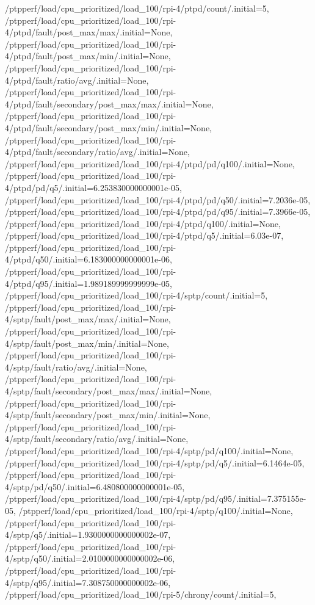 {    /ptpperf/load/cpu_prioritized/load_100/rpi-4/ptpd/count/.initial=5,
    /ptpperf/load/cpu_prioritized/load_100/rpi-4/ptpd/fault/post_max/max/.initial=None,
    /ptpperf/load/cpu_prioritized/load_100/rpi-4/ptpd/fault/post_max/min/.initial=None,
    /ptpperf/load/cpu_prioritized/load_100/rpi-4/ptpd/fault/ratio/avg/.initial=None,
    /ptpperf/load/cpu_prioritized/load_100/rpi-4/ptpd/fault/secondary/post_max/max/.initial=None,
    /ptpperf/load/cpu_prioritized/load_100/rpi-4/ptpd/fault/secondary/post_max/min/.initial=None,
    /ptpperf/load/cpu_prioritized/load_100/rpi-4/ptpd/fault/secondary/ratio/avg/.initial=None,
    /ptpperf/load/cpu_prioritized/load_100/rpi-4/ptpd/pd/q100/.initial=None,
    /ptpperf/load/cpu_prioritized/load_100/rpi-4/ptpd/pd/q5/.initial=6.253830000000001e-05,
    /ptpperf/load/cpu_prioritized/load_100/rpi-4/ptpd/pd/q50/.initial=7.2036e-05,
    /ptpperf/load/cpu_prioritized/load_100/rpi-4/ptpd/pd/q95/.initial=7.3966e-05,
    /ptpperf/load/cpu_prioritized/load_100/rpi-4/ptpd/q100/.initial=None,
    /ptpperf/load/cpu_prioritized/load_100/rpi-4/ptpd/q5/.initial=6.03e-07,
    /ptpperf/load/cpu_prioritized/load_100/rpi-4/ptpd/q50/.initial=6.183000000000001e-06,
    /ptpperf/load/cpu_prioritized/load_100/rpi-4/ptpd/q95/.initial=1.989189999999999e-05,
    /ptpperf/load/cpu_prioritized/load_100/rpi-4/sptp/count/.initial=5,
    /ptpperf/load/cpu_prioritized/load_100/rpi-4/sptp/fault/post_max/max/.initial=None,
    /ptpperf/load/cpu_prioritized/load_100/rpi-4/sptp/fault/post_max/min/.initial=None,
    /ptpperf/load/cpu_prioritized/load_100/rpi-4/sptp/fault/ratio/avg/.initial=None,
    /ptpperf/load/cpu_prioritized/load_100/rpi-4/sptp/fault/secondary/post_max/max/.initial=None,
    /ptpperf/load/cpu_prioritized/load_100/rpi-4/sptp/fault/secondary/post_max/min/.initial=None,
    /ptpperf/load/cpu_prioritized/load_100/rpi-4/sptp/fault/secondary/ratio/avg/.initial=None,
    /ptpperf/load/cpu_prioritized/load_100/rpi-4/sptp/pd/q100/.initial=None,
    /ptpperf/load/cpu_prioritized/load_100/rpi-4/sptp/pd/q5/.initial=6.1464e-05,
    /ptpperf/load/cpu_prioritized/load_100/rpi-4/sptp/pd/q50/.initial=6.480800000000001e-05,
    /ptpperf/load/cpu_prioritized/load_100/rpi-4/sptp/pd/q95/.initial=7.375155e-05,
    /ptpperf/load/cpu_prioritized/load_100/rpi-4/sptp/q100/.initial=None,
    /ptpperf/load/cpu_prioritized/load_100/rpi-4/sptp/q5/.initial=1.9300000000000002e-07,
    /ptpperf/load/cpu_prioritized/load_100/rpi-4/sptp/q50/.initial=2.0100000000000002e-06,
    /ptpperf/load/cpu_prioritized/load_100/rpi-4/sptp/q95/.initial=7.308750000000002e-06,
    /ptpperf/load/cpu_prioritized/load_100/rpi-5/chrony/count/.initial=5,
}
